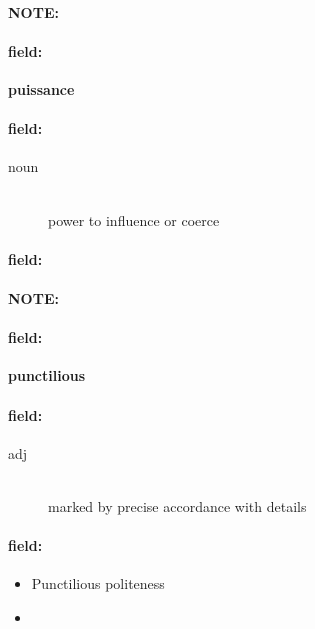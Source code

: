 \documentclass[12pt]{article}
\newenvironment{note}{\paragraph{NOTE:}}{}
\newenvironment{field}{\paragraph{field:}}{}
\begin{document}
\begin{note}
\begin{field}
\textbf{\large puissance}
\end{field}


\begin{field}
\begin{description}
\item[noun] \hfill \\ 
power to influence or coerce

\end{description}
\end{field}

\begin{field}
\end{field}
\end{note}
\begin{note}
\begin{field}
\textbf{\large punctilious}
\end{field}


\begin{field}
\begin{description}
\item[adj] \hfill \\ 
marked by precise accordance with details

\end{description}
\end{field}

\begin{field}
\begin{itemize}
\item Punctilious politeness
\item 
\end{itemize}
\end{field}
\end{note}
\end{document}
